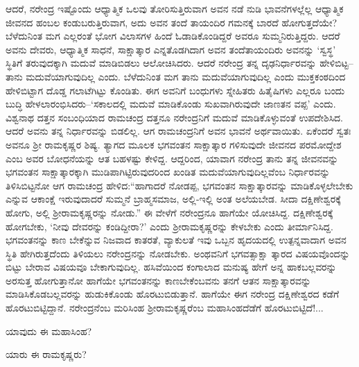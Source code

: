 ಆದರೆ, ನರೇಂದ್ರ ಇಷ್ಟೊಂದು ಆಧ್ಯಾತ್ಮಿಕ ಒಲವು ತೋರಿಸುತ್ತಿರುವಾಗ ಅವನ ನಡೆ ನುಡಿ ಭಾವನೆಗಳಲ್ಲೆಲ್ಲ ಆಧ್ಯಾತ್ಮಿಕ ಜೀವನದ ಹಂಬಲ ಕಂಡುಬರುತ್ತಿರುವಾಗ, ಅದು ಅವನ ತಂದೆ ತಾಯಂದಿರ ಗಮನಕ್ಕೆ ಬಾರದೆ ಹೋಗುತ್ತದೆಯೇ? ಬೆಳೆದುನಿಂತ ಮಗ ಎಲ್ಲರಂತೆ ಭೋಗ ವಿಲಾಸಗಳ ಹಿಂದೆ ಓಡಾಡಿಕೊಂಡಿದ್ದರೆ ಅವರೂ ಸುಮ್ಮನಿರುತ್ತಿದ್ದರು. ಆದರೆ ಅವನು ದೇವರು, ಆಧ್ಯಾತ್ಮಿಕ ಸಾಧನೆ, ಸಾಕ್ಷಾತ್ಕಾರ ಎನ್ನತೊಡಗಿದಾಗ ಅವನ ತಂದೆತಾಯಂದಿರು ಅವನನ್ನು ‘ಸ್ವಸ್ಥ’ ಸ್ಥಿತಿಗೆ ತರುವುದಕ್ಕಾಗಿ ಮದುವೆ ಮಾಡಿಬಿಡಲು ಆಲೋಚಿಸಿದರು. ಆದರೆ ನರೇಂದ್ರ ತನ್ನ ದೃಢನಿರ್ಧಾರವನ್ನು ಹೇಳಿಬಿಟ್ಟ–ತಾನು ಮದುವೆಯಾಗುವುದಿಲ್ಲ ಎಂದು. ಬೆಳೆದುನಿಂತ ಮಗ ತಾನು ಮದುವೆಯಾಗುವುದಿಲ್ಲ ಎಂದು ಮುಕ್ತಕಂಠದಿಂದ ಹೇಳಿಬಿಟ್ಟಾಗ ದೊಡ್ಡ ಗಲಾಟೆಗಿಟ್ಟು ಕೊಂಡಿತು. ಈಗ ಅವನಿಗೆ ಬಂಧುಗಳು ಸ್ನೇಹಿತರು ಹಿತೈಷಿಗಳು ಎಲ್ಲರೂ ಬಂದು ಬುದ್ಧಿ ಹೇಳಲಾರಂಭಿಸಿದರು–‘ಸಕಾಲದಲ್ಲಿ ಮದುವೆ ಮಾಡಿಕೊಂಡು ಸುಖವಾಗಿರುವುದೇ ಜಾಣತನ ವಪ್ಪ’ ಎಂದು. ವಿಶ್ವನಾಥ ದತ್ತನ ಸಂಬಂಧಿಯಾದ ರಾಮಚಂದ್ರ ದತ್ತನೂ ನರೇಂದ್ರನಿಗೆ ಮದುವೆ ಮಾಡಿಕೊಳ್ಳುವಂತೆ ಉಪದೇಶಿಸಿದ. ಆದರೆ ಅವನು ತನ್ನ ನಿರ್ಧಾರವನ್ನು ಬಿಡಲಿಲ್ಲ. ಆಗ ರಾಮಚಂದ್ರನಿಗೆ ಅವನ ಭಾವನೆ ಅರ್ಥವಾಯಿತು. ಏಕೆಂದರೆ ಸ್ವತಃ ಅವನೂ ಶ್ರೀ ರಾಮಕೃಷ್ಣರ ಶಿಷ್ಯ. ತ್ಯಾಗದ ಮೂಲಕ ಭಗವಂತನ ಸಾಕ್ಷಾತ್ಕಾರ ಗಳಿಸುವುದೇ ಜೀವನದ ಪರಮೋದ್ದೇಶ ಎಂಬ ಅವರ ಬೋಧನೆಯನ್ನು ಆತ ಬಹಳಷ್ಟು ಕೇಳಿದ್ದ. ಆದ್ದರಿಂದ, ಯಾವಾಗ ನರೇಂದ್ರ ತಾನು ತನ್ನ ಜೀವನವನ್ನು ಭಗವಂತನ ಸಾಕ್ಷಾತ್ಕಾರಕ್ಕಾಗಿ ಮುಡಿಪಾಗಿಟ್ಟಿರುವುದರಿಂದ ಖಂಡಿತ ಮದುವೆಯಾಗುವುದಿಲ್ಲವೆಂಬ ನಿರ್ಧಾರವನ್ನು ತಿಳಿಸಿಬಿಟ್ಟನೋ ಆಗ ರಾಮಚಂದ್ರ ಹೇಳಿದ:“ಹಾಗಾದರೆ ನೋಡಪ್ಪ, ಭಗವಂತನ ಸಾಕ್ಷಾತ್ಕಾರವನ್ನು ಮಾಡಿಕೊಳ್ಳಲೇಬೇಕು ಎನ್ನುವ ಆಕಾಂಕ್ಷೆ ಇರುವುದಾದರೆ ಸುಮ್ಮನೆ ಬ್ರಾಹ್ಮಸಮಾಜ, ಅಲ್ಲಿ-ಇಲ್ಲಿ ಅಂತ ಅಲೆಯಬೇಡ. ಸೀದಾ ದಕ್ಷಿಣೇಶ್ವರಕ್ಕೆ ಹೋಗು, ಅಲ್ಲಿ ಶ್ರೀರಾಮಕೃಷ್ಣರನ್ನು ನೋಡು.” ಈ ವೇಳೆಗೆ ನರೇಂದ್ರನೂ ಹಾಗೆಯೇ ಯೋಚಿಸಿದ್ದ. ದಕ್ಷಿಣೇಶ್ವರಕ್ಕೆ ಹೋಗಬೇಕು, ‘ನೀವು ದೇವರನ್ನು ಕಂಡಿದ್ದೀರಾ?’ ಎಂದು ಶ್ರೀರಾಮಕೃಷ್ಣರನ್ನು ಕೇಳಬೇಕು ಎಂದು ತೀರ್ಮಾನಿಸಿದ್ದ. ಭಗವಂತನನ್ನು ಕಾಣ ಬೇಕೆನ್ನುವ ನಿಜವಾದ ಕಾತರತೆ, ವ್ಯಾಕುಲತೆ ಇವು ಒಬ್ಬನ ಹೃದಯದಲ್ಲಿ ಉತ್ಪನ್ನವಾದಾಗ ಅವನ ಸ್ಥಿತಿ ಹೇಗಿರುತ್ತದೆಂದು ತಿಳಿಯಲು ನರೇಂದ್ರನನ್ನು ನೋಡಬೇಕು. ಅಂಥವನಿಗೆ ಭಗವತ್ಸಾಕ್ಷಾ ತ್ಕಾರದ ವಿಷಯವೊಂದನ್ನು ಬಿಟ್ಟು ಬೇರಾವ ವಿಷಯವೂ ಬೇಕಾಗುವುದಿಲ್ಲ. ಹಸಿವೆಯಿಂದ ಕಂಗಾಲಾದ ಮನುಷ್ಯ ಹೇಗೆ ಅನ್ನ ಹಾಕಬಲ್ಲವರನ್ನು ಅರಸುತ್ತ ಹೋಗುತ್ತಾನೋ ಹಾಗೆಯೇ ಭಗವಂತನನ್ನು ಕಾಣಬೇಕೆಂಬವನು ತನಗೆ ಆತನ ಸಾಕ್ಷಾತ್ಕಾರವನ್ನು ಮಾಡಿಸಿಕೊಡಬಲ್ಲವರನ್ನು ಹುಡುಕಿಕೊಂಡು ಹೊರಟುಬಿಡುತ್ತಾನೆ. ಹಾಗೆಯೇ ಈಗ ನರೇಂದ್ರ ದಕ್ಷಿಣೇಶ್ವರದ ಕಡೆಗೆ ಹೊರಟುಬಿಟ್ಟಿದ್ದಾನೆ. ನರೇಂದ್ರನೆಂಬ ಮರಿಸಿಂಹ ಶ್ರೀರಾಮಕೃಷ್ಣರೆಂಬ ಮಹಾಸಿಂಹದೆಡೆಗೆ ಹೊರಟುಬಿಟ್ಟಿದೆ!... 

ಯಾವುದು ಈ ಮಹಾಸಿಂಹ?

ಯಾರು ಈ ರಾಮಕೃಷ್ಣರು?

